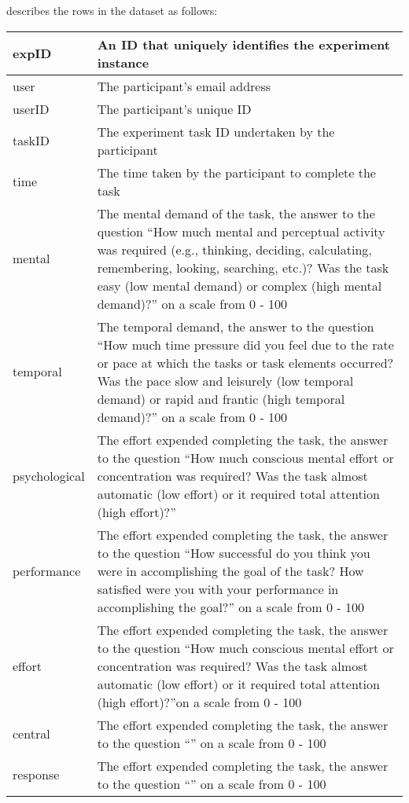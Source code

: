 \citep{longo2014formalising} describes the rows in the dataset as follows:

\begin{table}[]
\centering
\begin{tabular}{|l|p{8cm}|}
\hline
 expID & An ID that uniquely identifies the experiment instance \\ \hline
 user & The participant's email address \\ \hline
 userID & The participant's unique ID \\ \hline
 taskID & The experiment task ID undertaken by the participant \\ \hline
 time & The time taken by the participant to complete the task \\ \hline
 mental & The mental demand of the task, the answer to the question ``How much mental and perceptual activity was required (e.g., thinking, deciding, calculating, remembering, looking, searching, etc.)? Was the task easy (low mental demand) or complex (high mental demand)?'' on a scale from 0 - 100 \\ \hline
 temporal & The temporal demand, the answer to the question ``How much time pressure did you feel due to the rate or pace at which the tasks or task elements occurred? Was the pace slow and leisurely (low temporal demand) or rapid and frantic (high temporal demand)?'' on a scale from 0 - 100\\ \hline
 psychological & The effort expended completing the task, the answer to the question ``How much conscious mental effort or concentration was required? Was the task almost automatic (low effort) or it required total attention (high effort)?'' \\ \hline
 performance & The effort expended completing the task, the answer to the question ``How successful do you think you were in accomplishing the goal of the task? How satisfied were you with your performance in accomplishing the goal?'' on a scale from 0 - 100 \\ \hline
 effort & The effort expended completing the task, the answer to the question ``How much conscious mental effort or concentration was required? Was the task almost automatic (low effort) or it required total attention (high effort)?''on a scale from 0 - 100 \\ \hline
 central & The effort expended completing the task, the answer to the question ``'' on a scale from 0 - 100 \\ \hline
 response & The effort expended completing the task, the answer to the question ``'' on a scale from 0 - 100 \\ \hline

\end{tabular}
\end{table}
